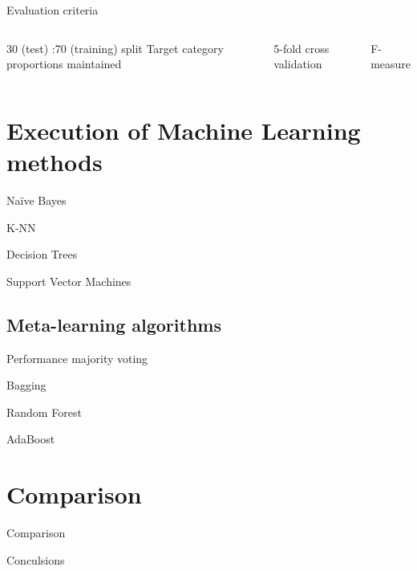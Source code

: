 \documentclass[aspectratio=169]{beamer}
\begin{document}
\begin{frame}{Evaluation criteria}
    \begin{columns}[t]
        30 (test) :70 (training) split
        Target category proportions maintained
        
        
        5-fold cross validation
        
        F-measure
        
        \normalsize
    \end{columns}
\end{frame}

\section{Execution of Machine Learning methods}

\begin{frame}{Na\"ive Bayes}
\end{frame}

\begin{frame}{K-NN}
\end{frame}

\begin{frame}{Decision Trees}
\end{frame}

\begin{frame}{Support Vector Machines}
\end{frame}

\subsection{Meta-learning algorithms}

\begin{frame}{Performance majority voting}
\end{frame}

\begin{frame}{Bagging}
\end{frame}

\begin{frame}{Random Forest}
\end{frame}

\begin{frame}{AdaBoost}
\end{frame}

\section{Comparison}

\begin{frame}{Comparison}
\end{frame}

\begin{frame}{Conculsions}
\end{frame}
\end{document}
